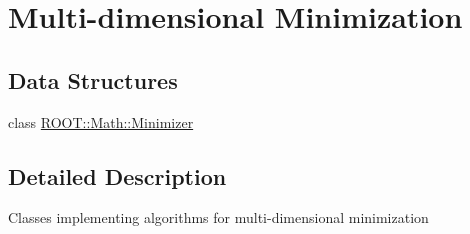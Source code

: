 \hypertarget{group__MultiMin}{}\section{Multi-\/dimensional Minimization}
\label{group__MultiMin}
\subsection*{Data Structures}
\begin{DoxyCompactItemize}
\item 
class \mbox{\hyperlink{classROOT_1_1Math_1_1Minimizer}{R\+O\+O\+T\+::\+Math\+::\+Minimizer}}
\end{DoxyCompactItemize}


\subsection{Detailed Description}
Classes implementing algorithms for multi-\/dimensional minimization 